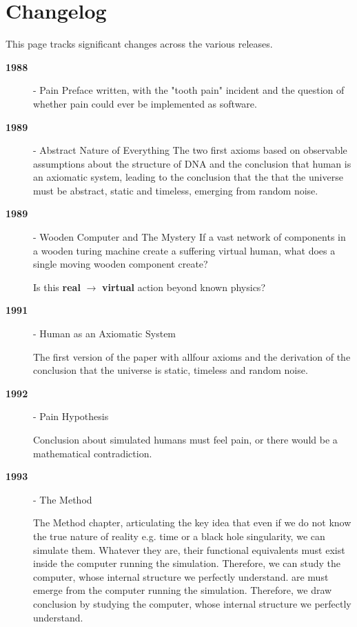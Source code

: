 \section*{Changelog}

This page tracks significant changes across the various releases.

\begin{description}


 \item[\textbf{1988}] - Pain
 Preface written, with the "tooth pain" incident and the question of whether pain could ever be implemented as software.


\item[\textbf{1989}] - Abstract Nature of Everything
  The two first axioms based on observable assumptions about the structure of DNA and the conclusion that human is an axiomatic system, 
  leading to the conclusion that the that the universe must be abstract, static and timeless, emerging from random noise. 


\item[\textbf{1989}] - Wooden Computer and The Mystery
  If a vast network of components in a wooden turing machine create a suffering virtual human, what does a single moving wooden component create?

  Is this \textbf{real} $\rightarrow$ \textbf{virtual} action beyond known physics?


\item[\textbf{1991}] - Human as an Axiomatic System

  The first version of the paper with allfour axioms and the derivation of the conclusion that the universe is static, timeless and random noise.


\item[\textbf{1992}] - Pain Hypothesis

  Conclusion about simulated humans must feel pain, or there would be a mathematical contradiction. 
  

\item[\textbf{1993}] - The Method

  The Method chapter, articulating the key idea that even if we do not know the true nature of reality e.g. time or a black hole singularity, we can simulate them. Whatever they are, their functional equivalents must exist inside the computer running the simulation. Therefore, we can study the computer, whose internal structure we perfectly understand.
are must emerge from the computer running the simulation. Therefore, we draw conclusion by studying the computer, whose internal structure we perfectly understand.



\end{description}
